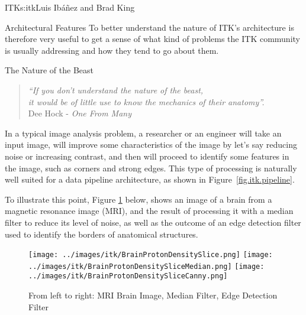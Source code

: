\begin{aosachapter}{ITK}{s:itk}{Luis Ib\'{a}\~{n}ez and Brad King}
\begin{aosasect1}{Architectural Features}
To better understand the nature of ITK's architecture is therefore very useful
to get a sense of what kind of problems the ITK community is usually addressing
and how they tend to go about them.

\begin{aosasect2}{The Nature of the Beast}

\begin{center}
\begin{quotation}
\emph{
``If you don't understand the nature of the beast,\\
it would be of little use to know the mechanics of their anatomy''.\\
}
\hfill Dee Hock - \emph{One From Many}
\end{quotation}
\end{center}

In a typical image analysis problem, a researcher or an engineer will take an
input image, will improve some characteristics of the image by let's say
reducing noise or increasing contrast, and then will proceed to identify some
features in the image, such as corners and strong edges. This type of
processing is naturally well suited for a data pipeline architecture, as
shown in Figure~\ref{fig.itk.pipeline}.

To illustrate this point, Figure \ref{fig.itk.brim} below, shows an image of a
brain from a magnetic resonance image (MRI), and the result of processing it
with a median filter to reduce its level of noise, as well as the outcome of an
edge detection filter used to identify the borders of anatomical structures.



%
%
%
\begin{figure}[h!]
\centering
\texttt{[image: ../images/itk/BrainProtonDensitySlice.png]}
\texttt{[image: ../images/itk/BrainProtonDensitySliceMedian.png]}
\texttt{[image: ../images/itk/BrainProtonDensitySliceCanny.png]}
\caption{From left to right: MRI Brain Image, Median Filter, Edge Detection Filter}
\label{fig.itk.brim}
\end{figure}


\end{aosasect2}
\end{aosasect1}
\end{aosachapter}
